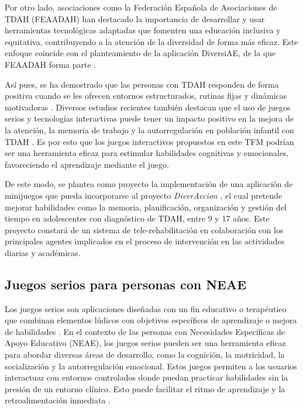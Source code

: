 Por otro lado, asociaciones como la Federación Española de Asociaciones de TDAH (FEAADAH) han destacado la importancia de desarrollar y usar herramientas tecnológicas adaptadas que fomenten una educación inclusiva y equitativa, contribuyendo a la atención de la diversidad de forma más eficaz. 
Este enfoque coincide con el planteamiento de la aplicación DiversiAE, de la que FEAADAH forma parte \parencite{feaadah_diversiae}.

Así pues, se ha demostrado que las personas con TDAH responden de forma positiva cuando se les ofrecen entornos estructurados, rutinas fijas y dinámicas motivadoras \parencite{tech_interventions_tdah}. 
Diversos estudios recientes también destacan que el uso de juegos serios y tecnologías interactivas puede tener un impacto positivo en la mejora de la atención, la memoria de trabajo y la autorregulación en población infantil con TDAH \parencite{doulou2025}. 
Es por esto que los juegos interactivos propuestos en este TFM podrían ser una herramienta eficaz para estimular habilidades cognitivas y emocionales, favoreciendo el aprendizaje mediante el juego.

De este modo, se plantea como proyecto la implementación de una aplicación de minijuegos que pueda incorporarse al proyecto \textit{DiverAccion} \parencite{diveraccion}, el cual pretende mejorar habilidades como la memoria, planificación, organización y gestión del tiempo en adolescentes con diagnóstico de TDAH, entre 9 y 17 años. 
Este proyecto constará de un sistema de tele-rehabilitación en colaboración con los principales agentes implicados en el proceso de intervención en las actividades diarias y académicas.

\subsection{Juegos serios para personas con NEAE}
Los juegos serios son aplicaciones diseñadas con un fin educativo o terapéutico que combinan elementos lúdicos con objetivos específicos de aprendizaje o mejora de habilidades \parencite{gamestrategies2025}.
En el contexto de las personas con Necesidades Específicas de Apoyo Educativo (NEAE), los juegos serios pueden ser una herramienta eficaz para abordar diversas áreas de desarrollo, como la cognición, la motricidad, la socialización y la autorregulación emocional.
Estos juegos permiten a los usuarios interactuar con entornos controlados donde puedan practicar habilidades sin la presión de un entorno clínico.
Esto puede facilitar el ritmo de aprendizaje y la retroalimentación inmediata \parencite{neurekalab2022}.

